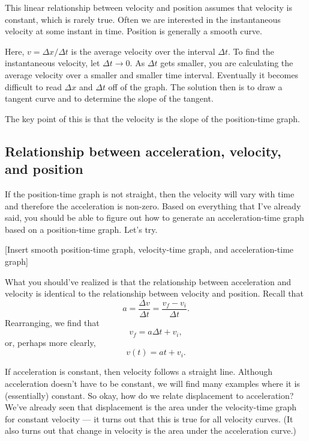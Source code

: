 This linear relationship between velocity and position assumes that velocity is constant, which is rarely true. Often we are interested in the instantaneous velocity at some instant in time. Position is generally a smooth curve.

\vspace{5cm}

Here, $v=\Delta{x}/\Delta{t}$ is the average velocity over the interval $\Delta{t}$. To find the instantaneous velocity, let $\Delta t\rightarrow 0$. As $\Delta{t}$ gets smaller, you are calculating the average velocity over a smaller and smaller time interval. Eventually it becomes difficult to read $\Delta{x}$ and $\Delta{t}$ off of the graph. The solution then is to draw a tangent curve and to determine the slope of the tangent.

The key point of this is that the velocity is the slope of the position-time graph.


\subsection{Relationship between acceleration, velocity, and position}
If the position-time graph is not straight, then the velocity will vary with time and therefore the acceleration is non-zero. Based on everything that I've already said, you should be able to figure out how to generate an acceleration-time graph based on a position-time graph. Let's try.

[Insert smooth position-time graph, velocity-time graph, and acceleration-time graph]
\vspace{8cm}

What you should've realized is that the relationship between acceleration and velocity is identical to the relationship between velocity and position. Recall that
$$a=\frac{\Delta{v}}{\Delta{t}}=\frac{v_f-v_i}{\Delta{t}}.$$
Rearranging, we find that
$$v_f=a\Delta{t}+v_i,$$
or, perhaps more clearly,
$$v(t)=at+v_i.$$

If acceleration is constant, then velocity follows a straight line. Although acceleration doesn't have to be constant, we will find many examples where it is (essentially) constant. So okay, how do we relate displacement to acceleration? We've already seen that displacement is the area under the velocity-time graph for constant velocity --- it turns out that this is true for all velocity curves. (It also turns out that change in velocity is the area under the acceleration curve.)


